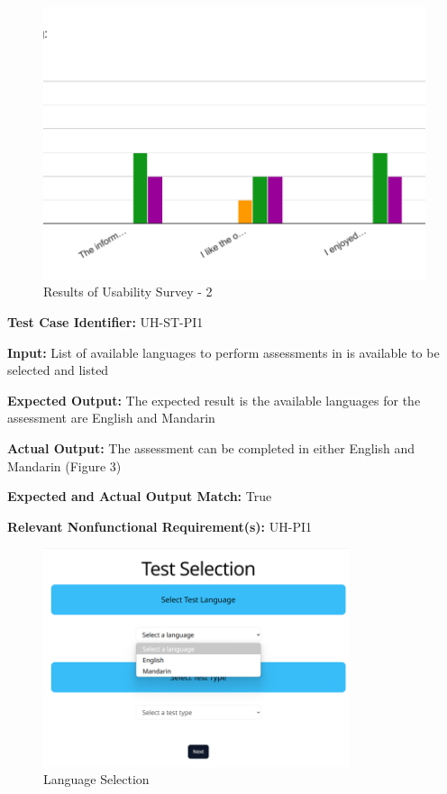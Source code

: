 \documentclass[12pt, titlepage]{article}
\begin{document}
\begin{figure}[h]
  \centering
  \includegraphics[width=1\textwidth]{images/UsabilityTestResults_pt2.png}
  \caption{Results of Usability Survey - 2}
\end{figure}

\newpage

\begin{mdframed}[linewidth=0.5mm] \par
  \textbf{Test Case Identifier:} UH-ST-PI1 \par
  \textbf{Input:} List of available languages to perform assessments in is available to be selected and listed \par
  \textbf{Expected Output:} The expected result is the available languages for the assessment are English and Mandarin  \par
  \textbf{Actual Output:} The assessment can be completed in either English and Mandarin (Figure 3)\par
  \textbf{Expected and Actual Output Match:} True \par
  \textbf{Relevant Nonfunctional Requirement(s):} UH-PI1
\end{mdframed}

\begin{figure}[h]
  \centering
  \includegraphics[width=0.8\textwidth]{images/LanguageSelection.png}
  \caption{Language Selection}
\end{figure}
\end{document}
